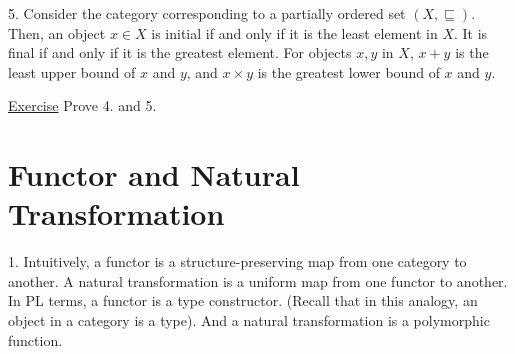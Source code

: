 \documentclass{report}[12pt]
\begin{document}
5. Consider the category corresponding to a partially ordered set $(X, \sqsubseteq)$. Then, an object $x \in X$ is initial if and only if it is the least element in $X$. It is final if and only if it is the greatest element. For objects $x, y$ in $X$, $x+y$ is the least upper bound of $x$ and $y$, and $x\times y$ is the greatest lower bound of $x$ and $y$.

\underline{Exercise} Prove 4. and 5.
\section{Functor and Natural Transformation}
1. Intuitively, a functor is a structure-preserving map from one category to another. A natural transformation is a uniform map from one functor to another. In PL terms, a functor is a type constructor. (Recall that in this analogy, an object in a category is a type). And a natural transformation is a polymorphic function.
\end{document}
